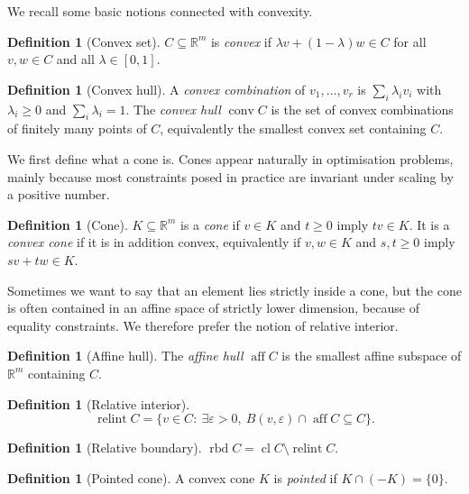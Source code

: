 \documentclass[a4paper,11pt]{book}
\theoremstyle{plain}
\theoremstyle{definition}
\newtheorem{definition}[theorem]{Definition}
\theoremstyle{remark}
\numberwithin{equation}{chapter}
\numberwithin{algorithm}{chapter}
\newcommand{\R}{\mathbb{R}}
\newcommand{\relint}{\operatorname{relint}}
\newcommand{\relbd}{\operatorname{rbd}}
\newcommand{\aff}{\operatorname{aff}}
\newcommand{\conv}{\operatorname{conv}}
\begin{document}
	We recall some basic notions connected with convexity.
	\begin{definition}[Convex set]
		$C\subseteq\R^m$ is \emph{convex} if $\lambda v+(1-\lambda)w\in C$ for all
		$v,w\in C$ and all $\lambda\in[0,1]$.
	\end{definition}
	
	\begin{definition}[Convex hull]
		A \emph{convex combination} of $v_1,\dots,v_r$ is $\sum_i\lambda_iv_i$ with
		$\lambda_i\geq0$ and $\sum_i\lambda_i=1$. The \emph{convex hull} $\conv C$ is
		the set of convex combinations of finitely many points of $C$, equivalently the
		smallest convex set containing $C$.
	\end{definition}
	
	We first define what a cone is. Cones appear naturally in optimisation
	problems, mainly because most constraints posed in practice are invariant under
	scaling by a positive number.
	
	\begin{definition}[Cone]
		$K\subseteq\R^m$ is a \emph{cone} if $v\in K$ and $t\geq0$ imply $tv\in K$. It
		is a \emph{convex cone} if it is in addition convex, equivalently if
		$v,w\in K$ and $s,t\geq0$ imply $sv+tw\in K$.
	\end{definition}
	
	
	Sometimes we want to say that an element lies strictly inside a cone, but the
	cone is often contained in an affine space of strictly lower dimension, because
	of equality constraints. We therefore prefer the notion of relative interior.
	
	\begin{definition}[Affine hull]
		The \emph{affine hull} $\aff C$ is the smallest affine subspace of $\R^m$
		containing $C$.
	\end{definition}
	
	\begin{definition}[Relative interior]
		\begin{equation}
			\relint C=\bigl\{v\in C:\ \exists\varepsilon>0,\
			B(v,\varepsilon)\cap\aff C\subseteq C\bigr\} .
		\end{equation}
	\end{definition}
	
	\begin{definition}[Relative boundary]
		$\relbd C=\operatorname{cl}C\setminus\relint C$.
	\end{definition}
	
	\begin{definition}[Pointed cone]
		A convex cone $K$ is \emph{pointed} if $K\cap(-K)=\{0\}$.
	\end{definition}
	
\end{document}
